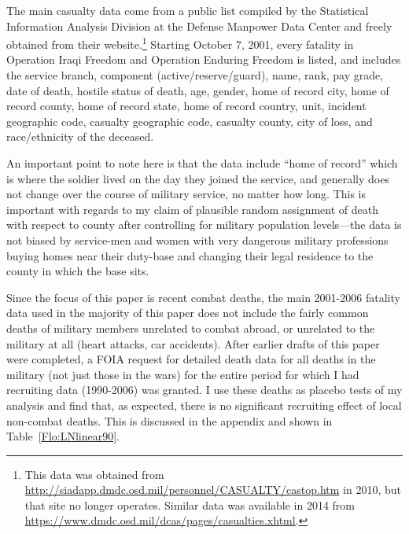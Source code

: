 \documentclass[12pt] {article}
\begin{document}

The main casualty data come from a public list compiled by the Statistical
Information Analysis Division at the Defense Manpower Data Center
and freely obtained from their website.\footnote{This data was obtained from  \url{http://siadapp.dmdc.osd.mil/personnel/CASUALTY/castop.htm} in 2010, but that site no longer operates. Similar data was available in 2014 from \url{https://www.dmdc.osd.mil/dcas/pages/casualties.xhtml}.}
Starting October 7, 2001, every fatality in Operation Iraqi Freedom
and Operation Enduring Freedom is listed, and includes
the service branch, component (active/reserve/guard), name, rank,
pay grade, date of death, hostile status of death, age, gender, home
of record city, home of record county, home of record state, home
of record country, unit, incident geographic code, casualty geographic
code, casualty county, city of loss, and race/ethnicity of the deceased.

An important point to note here is that the data include {}``home
of record'' which is where the soldier lived on the day they joined
the service, and generally does not change over the course of military service, no matter how long. This is important with regards to my claim of plausible
random assignment of death with respect to county after controlling
for military population levels---the data is not biased by service-men
and women with very dangerous military professions buying homes near
their duty-base and changing their legal residence to the county in
which the base sits. 

Since the focus of this paper is recent combat deaths, the main 2001-2006 fatality data used in the majority of this paper does not include the fairly common deaths of military members unrelated to combat abroad, or unrelated to the military at all (heart attacks, car accidents).  After earlier drafts of this paper were completed, a FOIA request for detailed death data for all  deaths in the military (not just those in the wars) for the entire period for which I had recruiting data (1990-2006) was granted. I use these deaths as placebo tests of my analysis and find that, as expected, there is no significant recruiting effect of local non-combat deaths. This is discussed in the appendix and shown in Table~\ref{Flo:LNlinear90}.
\end{document}
